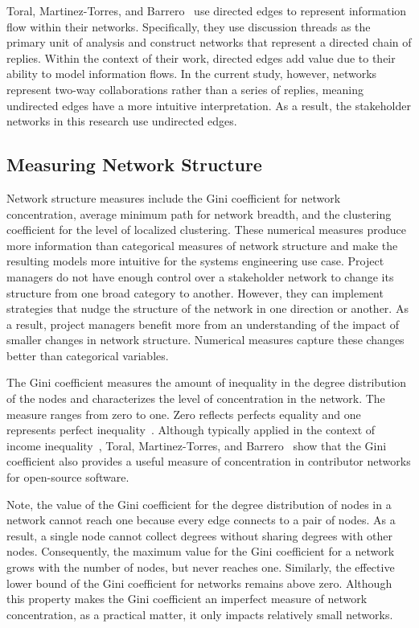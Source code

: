 Toral, Martinez-Torres, and Barrero~\cite{toral} use directed edges to represent information flow within their networks. Specifically, they use discussion threads as the primary unit of analysis and construct networks that represent a directed chain of replies. Within the context of their work, directed edges add value due to their ability to model information flows. In the current study, however, networks represent two-way collaborations rather than a series of replies, meaning undirected edges have a more intuitive interpretation. As a result, the stakeholder networks in this research use undirected edges.

\subsection{Measuring Network Structure}
\label{network_structure}

Network structure measures include the Gini coefficient for network concentration, average minimum path for network breadth, and the clustering coefficient for the level of localized clustering. These numerical measures produce more information than categorical measures of network structure and make the resulting models more intuitive for the systems engineering use case. Project managers do not have enough control over a stakeholder network to change its structure from one broad category to another. However, they can implement strategies that nudge the structure of the network in one direction or another. As a result, project managers benefit more from an understanding of the impact of smaller changes in network structure. Numerical measures capture these changes better than categorical variables.

The Gini coefficient measures the amount of inequality in the degree distribution of the nodes and characterizes the level of concentration in the network. The measure ranges from zero to one. Zero reflects perfects equality and one represents perfect inequality~\cite{gini}. Although typically applied in the context of income inequality~\cite{gini2, yitzhaki}, Toral, Martinez-Torres, and Barrero~\cite{toral} show that the Gini coefficient also provides a useful measure of concentration in contributor networks for open-source software. 

Note, the value of the Gini coefficient for the degree distribution of nodes in a network cannot reach one because every edge connects to a pair of nodes. As a result, a single node cannot collect degrees without sharing degrees with other nodes. Consequently, the maximum value for the Gini coefficient for a network grows with the number of nodes, but never reaches one. Similarly, the effective lower bound of the Gini coefficient for networks remains above zero. Although this property makes the Gini coefficient an imperfect measure of network concentration, as a practical matter, it only impacts relatively small networks.

